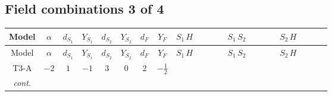 \documentclass[8pt]{article}
\begin{document}
\begin{landscape}
\subsection*{Field combinations 3 of 4}
\begin{longtable}{@{}cccccccc >{\raggedright\arraybackslash}p{0.21\linewidth} >{\raggedright\arraybackslash}p{0.21\linewidth} >{\raggedright\arraybackslash}p{0.21\linewidth}@{}}
\toprule
Model & $\alpha$ & $d_{S_1}$ & $Y_{S_1}$ & $d_{S_2}$ & $Y_{S_2}$ & $d_F$ & $Y_F$ & $S_1\,H$ & $S_1\,S_2$ & $S_2\,H$ \\
\midrule
\endfirsthead
\toprule
Model & $\alpha$ & $d_{S_1}$ & $Y_{S_1}$ & $d_{S_2}$ & $Y_{S_2}$ & $d_F$ & $Y_F$ & $S_1\,H$ & $S_1\,S_2$ & $S_2\,H$ \\
\midrule
\endhead
T3-A & $-2$ & $1$ & $-1$ & $3$ & $0$ & $2$ & $-\frac{1}{2}$ & \scriptsize\adjustbox{max width=\linewidth}{$\begin{gathered} +H_{a_2} S_1 H_{a_1}{}^{\dagger } S_1{}^{\dagger } \mathcal{I}_{H1,a_1,a_2}{}^1 \lambda_{H1}^{(1)}\end{gathered}$} & \scriptsize\adjustbox{max width=\linewidth}{$\begin{gathered} +S_1 S_{2,j_2} S_1{}^{\dagger } S_{2,j_1}{}^{\dagger } \mathcal{I}_{12,j_1,j_2}{}^1 \lambda_{12}^{(1)}\end{gathered}$} & \scriptsize\adjustbox{max width=\linewidth}{$\begin{gathered} +\frac{1}{2} H_{a_2} S_{2,j_2} H_{a_1}{}^{\dagger } S_{2,j_1}{}^{\dagger } \mathcal{I}_{H2,a_1,a_2,j_1,j_2}{}^1 \lambda_{H2}^{(1)} \\ +\frac{1}{2} H_{a_2} S_{2,j_2} H_{a_1}{}^{\dagger } S_{2,j_1}{}^{\dagger } \mathcal{I}_{H2,a_1,a_2,j_2,j_1}{}^1 \lambda_{H2}^{(1)} \\ +\frac{1}{2} H_{a_2} S_{2,j_2} H_{a_1}{}^{\dagger } S_{2,j_1}{}^{\dagger } \mathcal{I}_{H2,a_1,a_2,j_1,j_2}{}^2 \lambda_{H2}^{(2)}\end{gathered}$} \\
\textit{cont.} &  &  &  &  &  &  &  &  &  & \scriptsize\adjustbox{max width=\linewidth}{$\begin{gathered} +\frac{1}{2} H_{a_2} S_{2,j_2} H_{a_1}{}^{\dagger } S_{2,j_1}{}^{\dagger } \mathcal{I}_{H2,a_1,a_2,j_2,j_1}{}^2 \lambda_{H2}^{(2)}\end{gathered}$} \\
\midrule

\end{longtable}
\end{landscape}
\end{document}
